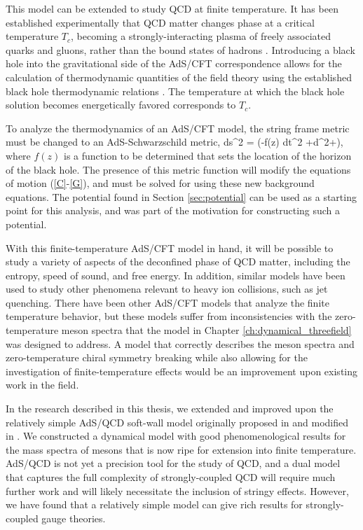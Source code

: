 This model can be extended to study QCD at finite temperature. 
It has been established experimentally that QCD matter changes phase at a critical temperature $T_c$, becoming a strongly-interacting plasma of freely associated quarks and gluons, rather than the bound states of hadrons \cite{qgp,qgp3,phases}.
Introducing a black hole into the gravitational side of the AdS/CFT correspondence allows for the calculation of thermodynamic quantities of the field theory using the established black hole thermodynamic relations \cite{Kovtun2005,Son:2007vk,Herzog:2006ra,BallonBayona:2007vp}.
The temperature at which the black hole solution becomes energetically favored corresponds to $T_c$.

To analyze the thermodynamics of an AdS/CFT model, the string frame metric must be changed to an AdS-Schwarzschild metric,
\be
ds^2 = \left(-f(z) dt^2 +d^2+\right), 
\ee
where $f(z)$ is a function to be determined that sets the location of the horizon of the black hole.
The presence of this metric function will modify the equations of motion (\ref{C}-\ref{G}), and must be solved for using these new background equations.
The potential found in Section \ref{sec:potential} can be used as a starting point for this analysis, and was part of the motivation for constructing such a potential.

With this finite-temperature AdS/CFT model in hand, it will be possible to study a variety of aspects of the deconfined phase of QCD matter, including the entropy, speed of sound, and free energy.
In addition, similar models have been used to study other phenomena relevant to heavy ion collisions, such as jet quenching.
There have been other AdS/CFT models that analyze the finite temperature behavior, but these models suffer from inconsistencies with the zero-temperature meson spectra that the model in Chapter \ref{ch:dynamical_threefield} was designed to address.
A model that correctly describes the meson spectra and zero-temperature chiral symmetry breaking while also allowing for the investigation of finite-temperature effects would be an improvement upon existing work in the field.

In the research described in this thesis, we extended and improved upon the relatively simple AdS/QCD soft-wall model originally proposed in \cite{karch-katz-son-adsqcd} and modified in \cite{gherghetta-kelley}.
We constructed a dynamical model with good phenomenological results for the mass spectra of mesons that is now ripe for extension into finite temperature.
 AdS/QCD is not yet a precision tool for the study of QCD, and a dual model that captures the full complexity of strongly-coupled QCD will require much further work and will likely necessitate the inclusion of stringy effects.
However, we have found that a relatively simple model can give rich results for strongly-coupled gauge theories. 




